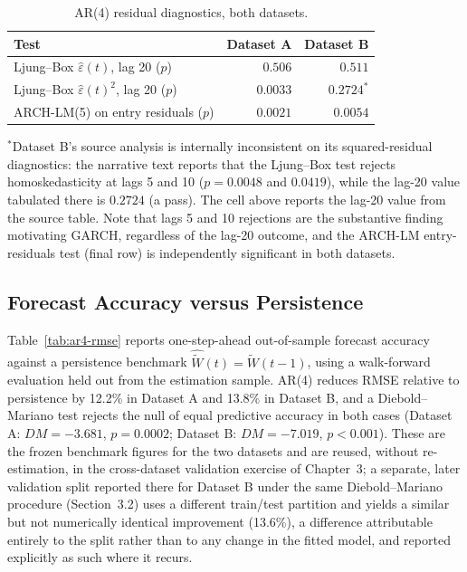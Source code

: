 \begin{table}[htbp]
\centering
\caption{AR(4) residual diagnostics, both datasets.}
\label{tab:ar4-diag}
\begin{tabular}{l r r}
\toprule
\textbf{Test} & \textbf{Dataset A} & \textbf{Dataset B} \\
\midrule
Ljung--Box $\hat\varepsilon(t)$, lag 20 ($p$) & $0.506$ & $0.511$ \\
Ljung--Box $\hat\varepsilon(t)^2$, lag 20 ($p$) & $0.0033$ & $0.2724^{\ast}$ \\
ARCH-LM(5) on entry residuals ($p$) & $0.0021$ & $0.0054$ \\
\bottomrule
\end{tabular}
\vspace{2pt}
{\footnotesize $^{\ast}$Dataset B's source analysis is internally inconsistent on its squared-residual diagnostics: the narrative text reports that the Ljung--Box test rejects homoskedasticity at lags 5 and 10 ($p = 0.0048$ and $0.0419$), while the lag-20 value tabulated there is $0.2724$ (a pass). The cell above reports the lag-20 value from the source table. Note that lags 5 and 10 rejections are the substantive finding motivating GARCH, regardless of the lag-20 outcome, and the ARCH-LM entry-residuals test (final row) is independently significant in both datasets.}
\end{table}

\subsection{Forecast Accuracy versus Persistence}
\label{sec:phase2-rmse}

Table~\ref{tab:ar4-rmse} reports one-step-ahead out-of-sample forecast accuracy against a persistence benchmark $\hat{\widetilde W}(t) = \widetilde W(t-1)$, using a walk-forward evaluation held out from the estimation sample. AR(4) reduces RMSE relative to persistence by 12.2\% in Dataset A and 13.8\% in Dataset B, and a Diebold--Mariano test \citep{DieboldMariano1995} rejects the null of equal predictive accuracy in both cases (Dataset A: $DM = -3.681$, $p = 0.0002$; Dataset B: $DM = -7.019$, $p < 0.001$). These are the frozen benchmark figures for the two datasets and are reused, without re-estimation, in the cross-dataset validation exercise of Chapter~3; a separate, later validation split reported there for Dataset B under the same Diebold--Mariano procedure (Section~3.2) uses a different train/test partition and yields a similar but not numerically identical improvement (13.6\%), a difference attributable entirely to the split rather than to any change in the fitted model, and reported explicitly as such where it recurs.

